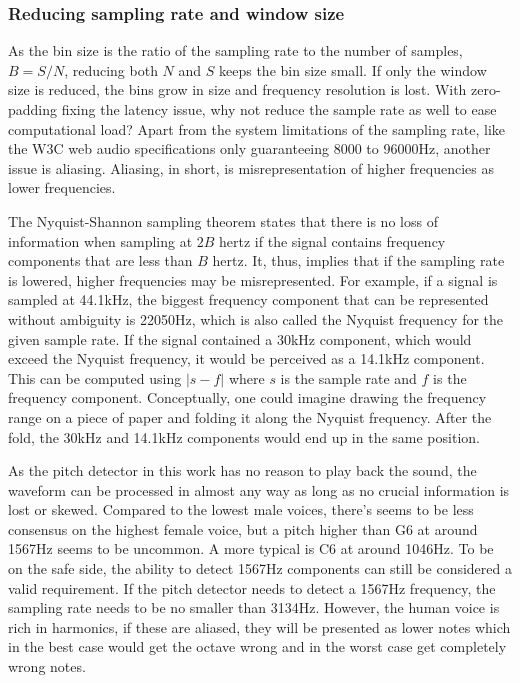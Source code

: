 \subsubsection{Reducing sampling rate and window size}
As the bin size is the ratio of the sampling rate to the number of samples, $B = S/N$, reducing both $N$ and $S$ keeps the bin size small. If only the window size is reduced, the bins grow in size and frequency resolution is lost. With zero-padding fixing the latency issue, why not reduce the sample rate as well to ease computational load? Apart from the system limitations of the sampling rate, like the W3C web audio specifications only guaranteeing 8000 to 96000Hz, another issue is aliasing. Aliasing, in short, is misrepresentation of higher frequencies as lower frequencies. 

The Nyquist-Shannon sampling theorem states that there is no loss of information when sampling at $2B$ hertz if the signal contains frequency components that are less than $B$ hertz. It, thus, implies that if the sampling rate is lowered, higher frequencies may be misrepresented. For example, if a signal is sampled at 44.1kHz, the biggest frequency component that can be represented without ambiguity is 22050Hz, which is also called the Nyquist frequency for the given sample rate. If the signal contained a 30kHz component, which would exceed the Nyquist frequency, it would be perceived as a 14.1kHz component. This can be computed using $|s-f|$ where $s$ is the sample rate and $f$ is the frequency component. Conceptually, one could imagine drawing the frequency range on a piece of paper and folding it along the Nyquist frequency. After the fold, the 30kHz and 14.1kHz components would end up in the same position.

As the pitch detector in this work has no reason to play back the sound, the waveform can be processed in almost any way as long as no crucial information is lost or skewed. Compared to the lowest male voices, there's seems to be less consensus on the highest female voice, but a pitch higher than G6 at around 1567Hz seems to be uncommon. A more typical is C6 at around 1046Hz. To be on the safe side, the ability to detect 1567Hz components can still be considered a valid requirement. If the pitch detector needs to detect a 1567Hz frequency, the sampling rate needs to be no smaller than 3134Hz. However, the human voice is rich in harmonics, if these are aliased, they will be presented as lower notes which in the best case would get the octave wrong and in the worst case get completely wrong notes.

